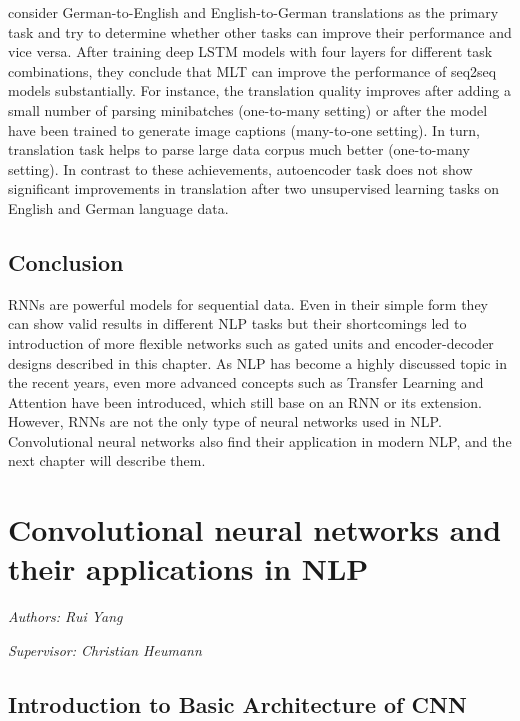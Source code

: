 \documentclass[]{krantz}
\begin{document}
\citet{luong2015multi} consider German-to-English and English-to-German translations as the primary task and try to determine whether other tasks can improve their performance and vice versa. After training deep LSTM models with four layers for different task combinations, they conclude that MLT can improve the performance of seq2seq models substantially. For instance, the translation quality improves after adding a small number of parsing minibatches (one-to-many setting) or after the model have been trained to generate image captions (many-to-one setting). In turn, translation task helps to parse large data corpus much better (one-to-many setting). In contrast to these achievements, autoencoder task does not show significant improvements in translation after two unsupervised learning tasks on English and German language data.

\hypertarget{conclusion}{%
\section{Conclusion}\label{conclusion}}

RNNs are powerful models for sequential data. Even in their simple form they can show valid results in different NLP tasks but their shortcomings led to introduction of more flexible networks such as gated units and encoder-decoder designs described in this chapter. As NLP has become a highly discussed topic in the recent years, even more advanced concepts such as Transfer Learning and Attention have been introduced, which still base on an RNN or its extension. However, RNNs are not the only type of neural networks used in NLP. Convolutional neural networks also find their application in modern NLP, and the next chapter will describe them.

\hypertarget{convolutional-neural-networks-and-their-applications-in-nlp}{%
\chapter{Convolutional neural networks and their applications in NLP}\label{convolutional-neural-networks-and-their-applications-in-nlp}}

\emph{Authors: Rui Yang}

\emph{Supervisor: Christian Heumann}

\hypertarget{introduction-to-basic-architecture-of-cnn}{%
\section{Introduction to Basic Architecture of CNN}\label{introduction-to-basic-architecture-of-cnn}}
\end{document}
